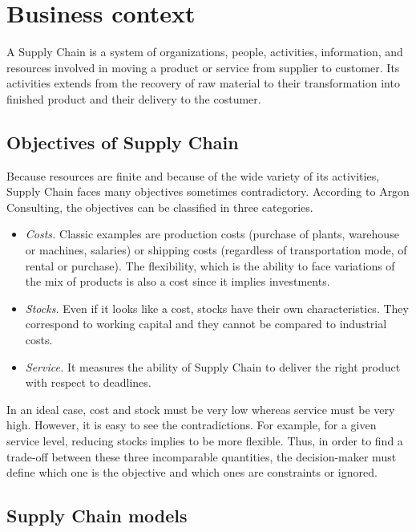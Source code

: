 \chapter{Business context}
\label{chap:business-context}


A Supply Chain is a system of organizations, people, activities, information, and resources involved in moving a product or service from supplier to customer.
Its activities extends from the recovery of raw material to their transformation into finished product and their delivery to the costumer.


\section{Objectives of Supply Chain}


Because resources are finite and because of the wide variety of its activities, Supply Chain faces many objectives sometimes contradictory. 
According to Argon Consulting, the objectives can be classified in three categories.
\begin{itemize}
  \item \emph{Costs.} Classic examples are production costs (purchase of plants, warehouse or machines, salaries) or shipping costs (regardless of transportation mode, of rental or purchase). The flexibility, which is the ability to face variations of the mix of products is also a cost since it implies investments.
  \item \emph{Stocks.} Even if it looks like a cost, stocks have their own characteristics. They correspond to working capital and they cannot be compared to industrial costs.
  \item \emph{Service.} It measures the ability of Supply Chain to deliver the right product with respect to deadlines.
\end{itemize}
In an ideal case, cost and stock must be very low whereas service must be very high. However, it is easy to see the contradictions. For example, for a given service level, reducing stocks implies to be more flexible. Thus, in order to find a trade-off between these three incomparable quantities, the decision-maker must define which one is the objective and which ones are constraints or ignored.



\section{Supply Chain models}


